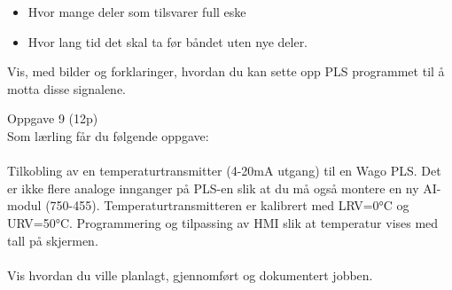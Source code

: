 \begin{itemize}[noitemsep]
	\item Hvor mange deler som tilsvarer full eske
	\item Hvor lang tid det skal ta før båndet uten nye deler. 
\end{itemize}
\vskip 5pt 
Vis, med bilder og forklaringer,  hvordan du kan sette opp PLS programmet til å motta disse signalene.
\vskip 0.5cm


\vfil\eject
Oppgave 9 (12p) \\ %
Som lærling får du følgende oppgave: \\\\
Tilkobling av en temperaturtransmitter (4-20mA utgang) til en Wago PLS. Det er ikke flere analoge innganger på PLS-en slik at du må også montere en ny AI-modul (750-455). Temperaturtransmitteren er kalibrert med LRV=0°C og URV=50°C. Programmering og tilpassing av HMI slik at temperatur vises med tall på skjermen. 
\\\\
Vis hvordan du ville planlagt, gjennomført og dokumentert jobben.


\vskip 5pt 
%

